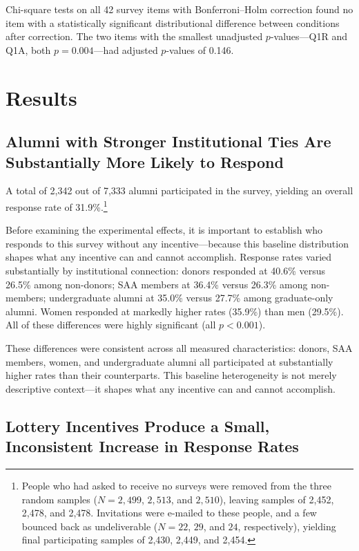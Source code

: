 Chi-square tests on all 42 survey items with Bonferroni--Holm correction found no item
with a statistically significant distributional difference between conditions after
correction. The two items with the smallest unadjusted $p$-values---Q1R and Q1A, both
$p = 0.004$---had adjusted $p$-values of 0.146.




\section{Results}

\subsection{Alumni with Stronger Institutional Ties Are Substantially More Likely to
  Respond}

A total of 2,342 out of 7,333 alumni participated in the survey, yielding an overall
response rate of 31.9\%.\footnote{People who had asked to receive no surveys were removed
  from the three random samples ($N = 2{,}499$, $2{,}513$, and $2{,}510$), leaving
  samples of 2,452, 2,478, and 2,478. Invitations were e-mailed to these people, and a
  few bounced back as undeliverable ($N = 22$, $29$, and $24$, respectively), yielding
  final participating samples of 2,430, 2,449, and 2,454.}

Before examining the experimental effects, it is important to establish who responds to
this survey without any incentive---because this baseline distribution shapes what any
incentive can and cannot accomplish. Response rates varied substantially by institutional
connection: donors responded at 40.6\% versus 26.5\% among non-donors; SAA members at
36.4\% versus 26.3\% among non-members; undergraduate alumni at 35.0\% versus 27.7\%
among graduate-only alumni. Women responded at markedly higher rates (35.9\%) than men
(29.5\%). All of these differences were highly significant (all $p < 0.001$).

These differences were consistent across all measured characteristics: donors, SAA
members, women, and undergraduate alumni all participated at substantially higher rates
than their counterparts. This baseline heterogeneity is not merely descriptive
context---it shapes what any incentive can and cannot accomplish.

\subsection{Lottery Incentives Produce a Small, Inconsistent Increase in Response Rates}

